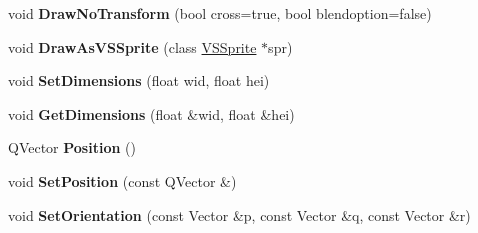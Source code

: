 \begin{DoxyCompactItemize}
\item 
void {\bfseries Draw\+No\+Transform} (bool cross=true, bool blendoption=false)\hypertarget{classAnimation_abe31bddf26a2a9ea9b796524271b2ef3}{}\label{classAnimation_abe31bddf26a2a9ea9b796524271b2ef3}

\item 
void {\bfseries Draw\+As\+V\+S\+Sprite} (class \hyperlink{classVSSprite}{V\+S\+Sprite} $\ast$spr)\hypertarget{classAnimation_a233b7936ab9edf6fbfc77c2d02884f60}{}\label{classAnimation_a233b7936ab9edf6fbfc77c2d02884f60}

\item 
void {\bfseries Set\+Dimensions} (float wid, float hei)\hypertarget{classAnimation_a7b40ccd4044dd8d22e0d0316941f0c28}{}\label{classAnimation_a7b40ccd4044dd8d22e0d0316941f0c28}

\item 
void {\bfseries Get\+Dimensions} (float \&wid, float \&hei)\hypertarget{classAnimation_a8f13ee7fc4e2fe9ca7f379031e5e3170}{}\label{classAnimation_a8f13ee7fc4e2fe9ca7f379031e5e3170}

\item 
Q\+Vector {\bfseries Position} ()\hypertarget{classAnimation_ad6a22c1d0955b39d57a6a078bb9a5e0a}{}\label{classAnimation_ad6a22c1d0955b39d57a6a078bb9a5e0a}

\item 
void {\bfseries Set\+Position} (const Q\+Vector \&)\hypertarget{classAnimation_a52400e63423ebdd95212cce589f9d396}{}\label{classAnimation_a52400e63423ebdd95212cce589f9d396}

\item 
void {\bfseries Set\+Orientation} (const Vector \&p, const Vector \&q, const Vector \&r)\hypertarget{classAnimation_a61296590598c512ce0c23ae4c8a28337}{}\label{classAnimation_a61296590598c512ce0c23ae4c8a28337}

\end{DoxyCompactItemize}
